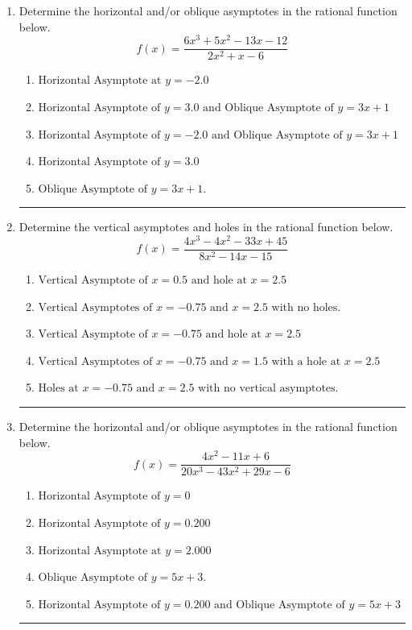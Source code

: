 \documentclass[14pt]{extbook}
\newcommand{\litem}[1]{\item#1\hspace*{-1cm}\rule{\textwidth}{0.4pt}}
\begin{document}
\begin{enumerate}
\litem{
Determine the horizontal and/or oblique asymptotes in the rational function below.\[ f(x) = \frac{6x^{3} +5 x^{2} -13 x -12}{2x^{2} +x -6} \]\begin{enumerate}[label=\Alph*.]
\item \( \text{Horizontal Asymptote at } y = -2.0 \)
\item \( \text{Horizontal Asymptote of } y = 3.0 \text{ and Oblique Asymptote of } y = 3x + 1 \)
\item \( \text{Horizontal Asymptote of } y = -2.0 \text{ and Oblique Asymptote of } y = 3x + 1 \)
\item \( \text{Horizontal Asymptote of } y = 3.0  \)
\item \( \text{Oblique Asymptote of } y = 3x + 1. \)

\end{enumerate} }
\litem{
Determine the vertical asymptotes and holes in the rational function below.\[ f(x) = \frac{4x^{3} -4 x^{2} -33 x + 45}{8x^{2} -14 x -15} \]\begin{enumerate}[label=\Alph*.]
\item \( \text{Vertical Asymptote of } x = 0.5 \text{ and hole at } x = 2.5 \)
\item \( \text{Vertical Asymptotes of } x = -0.75 \text{ and } x = 2.5 \text{ with no holes.} \)
\item \( \text{Vertical Asymptote of } x = -0.75 \text{ and hole at } x = 2.5 \)
\item \( \text{Vertical Asymptotes of } x = -0.75 \text{ and } x = 1.5 \text{ with a hole at } x = 2.5 \)
\item \( \text{Holes at } x = -0.75 \text{ and } x = 2.5 \text{ with no vertical asymptotes.} \)

\end{enumerate} }
\litem{
Determine the horizontal and/or oblique asymptotes in the rational function below.\[ f(x) = \frac{4x^{2} -11 x + 6}{20x^{3} -43 x^{2} +29 x -6} \]\begin{enumerate}[label=\Alph*.]
\item \( \text{Horizontal Asymptote of } y = 0 \)
\item \( \text{Horizontal Asymptote of } y = 0.200  \)
\item \( \text{Horizontal Asymptote at } y = 2.000 \)
\item \( \text{Oblique Asymptote of } y = 5x + 3. \)
\item \( \text{Horizontal Asymptote of } y = 0.200 \text{ and Oblique Asymptote of } y = 5x + 3 \)


\end{enumerate}}
\end{enumerate}
\end{document}
